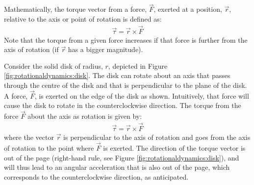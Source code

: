 Mathematically, the torque vector from a force, $\vec F$, exerted at a position, $\vec r$, relative to the axis or point of rotation is defined as:
\begin{align*}
\vec \tau = \vec r \times \vec F
\end{align*}
Note that the torque from a given force increases if that force is further from the axis of rotation (if $\vec r$ has a bigger magnitude). 

Consider the solid disk of radius, $r$, depicted in Figure \ref{fig:rotationaldynamics:disk}. The disk can rotate about an axis that passes through the centre of the disk and that is perpendicular to the plane of the disk. A force, $\vec F$, is exerted on the edge of the disk as shown.
Intuitively, that force will cause the disk to rotate in the counterclockwise direction. The torque from the force $\vec F$ about the axis as rotation is given by:
\begin{align*}
\vec \tau = \vec r \times \vec F
\end{align*}
where the vector $\vec r$ is perpendicular to the axis of rotation and goes from the axis of rotation to the point where $\vec F$ is exerted. The direction of the torque vector is out of the page (right-hand rule, see Figure \ref{fig:rotationaldynamics:disk}), and will thus lead to an angular acceleration that is also out of the page, which corresponds to the counterclockwise direction, as anticipated. 

